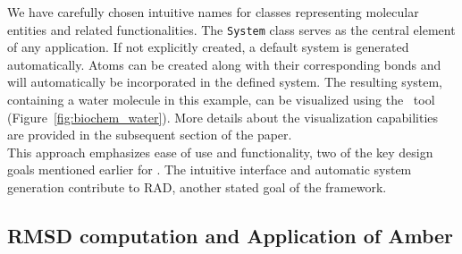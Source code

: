We have carefully chosen intuitive names for classes representing molecular entities and related functionalities. The \texttt{System} class serves as the central element of any application. If not explicitly created, a default system is generated automatically. Atoms can be created along with their corresponding bonds and will automatically be incorporated in the defined system. The resulting system, containing a water molecule in this example, can be visualized using the \bioviz\ tool (Figure~\ref{fig:biochem_water}). More details about the visualization capabilities are provided in the subsequent section of the paper. \\
This approach emphasizes ease of use and functionality, two of the key design goals mentioned earlier for \biochem. The intuitive interface and automatic system generation contribute to RAD, another stated goal of the framework.



\subsection{RMSD computation and Application of Amber}

